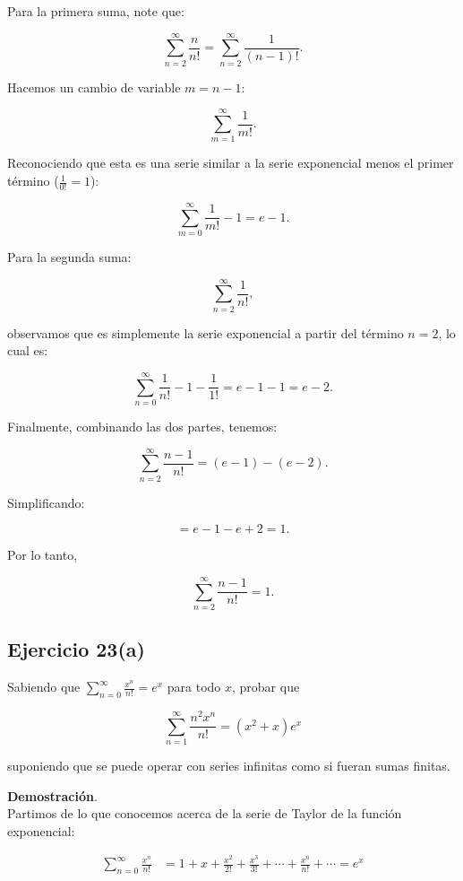 \documentclass{article}
\begin{document}
    Para la primera suma, note que:

    $$
    \sum_{n=2}^{\infty} \frac{n}{n!} = \sum_{n=2}^{\infty} \frac{1}{(n-1)!}.
    $$

    Hacemos un cambio de variable $m = n - 1$:

    $$
    \sum_{m=1}^{\infty} \frac{1}{m!}.
    $$

    Reconociendo que esta es una serie similar a la serie exponencial menos el primer término ($\frac{1}{0!} = 1$):

    $$
    \sum_{m=0}^{\infty} \frac{1}{m!} - 1 = e - 1.
    $$

    Para la segunda suma:

    $$
    \sum_{n=2}^{\infty} \frac{1}{n!},
    $$

    observamos que es simplemente la serie exponencial a partir del término $n=2$, lo cual es:

    $$
    \sum_{n=0}^{\infty} \frac{1}{n!} - 1 - \frac{1}{1!} = e - 1 - 1 = e - 2.
    $$

    Finalmente, combinando las dos partes, tenemos:

    $$
    \sum_{n=2}^{\infty} \frac{n-1}{n!} = (e - 1) - (e - 2).
    $$

    Simplificando:

    $$
    = e - 1 - e + 2 = 1.
    $$

    Por lo tanto,

    $$
    \sum_{n=2}^{\infty} \frac{n-1}{n!} = 1.
    $$

    \subsection*{Ejercicio 23(a)}

    Sabiendo que $\sum_{n=0}^{\infty} \frac{x^{n}}{n!}=e^{x}$ para todo $x$, probar que

    $$
    \sum_{n=1}^{\infty} \frac{n^{2} x^{n}}{n!}=\left(x^{2}+x\right) e^{x}
    $$

    suponiendo que se puede operar con series infinitas como si fueran sumas finitas.

    \textbf{Demostración}.\\

    Partimos de lo que conocemos acerca de la serie de Taylor de la función exponencial:

    \begin{align*}
    \sum_{n=0}^{\infty} \frac{x^{n}}{n!} &= 1 + x + \frac{x^{2}}{2!} + \frac{x^{3}}{3!} + \cdots + \frac{x^{n}}{n!} + \cdots = e^{x}
    \end{align*}
\end{document}
